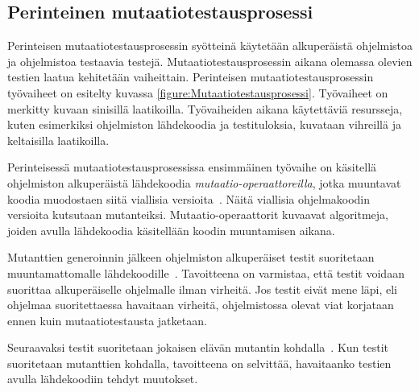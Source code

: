 \documentclass[finnish, grading]{tktltiki2}
\theoremstyle{definition}
\theoremstyle{remark}
\begin{document}


\subsection{Perinteinen mutaatiotestausprosessi}

Perinteisen mutaatiotestausprosessin syötteinä käytetään alkuperäistä ohjelmistoa ja ohjelmistoa testaavia testejä. Mutaatiotestausprosessin aikana olemassa olevien testien laatua kehitetään vaiheittain. Perinteisen mutaatiotestausprosessin työvaiheet on esitelty kuvassa \ref{figure:Mutaatiotestausprosessi}. Työvaiheet on merkitty kuvaan sinisillä laatikoilla. Työvaiheiden aikana käytettäviä resursseja, kuten esimerkiksi ohjelmiston lähdekoodia ja testituloksia, kuvataan vihreillä ja keltaisilla laatikoilla.

Perinteisessä mutaatiotestausprosessissa ensimmäinen työvaihe on käsitellä ohjelmiston alkuperäistä lähdekoodia \textit{mutaatio-operaattoreilla}, jotka muuntavat koodia muodostaen siitä viallisia versioita~\cite[s. 869]{Ma:Harrold:Kwon:2006}. Näitä viallisia ohjelmakoodin versioita kutsutaan mutanteiksi. Mutaatio-operaattorit kuvaavat algoritmeja, joiden avulla lähdekoodia käsitellään koodin muuntamisen aikana.

Mutanttien generoinnin jälkeen ohjelmiston alkuperäiset testit suoritetaan muuntamattomalle lähdekoodille~\cite[s. 652]{Jia:Harman:2011}. Tavoitteena on varmistaa, että testit voidaan suorittaa alkuperäiselle ohjelmalle ilman virheitä. Jos testit eivät mene läpi, eli ohjelmaa suoritettaessa havaitaan virheitä, ohjelmistossa olevat viat korjataan ennen kuin mutaatiotestausta jatketaan. 

Seuraavaksi testit suoritetaan jokaisen elävän mutantin kohdalla~\cite[s. 35]{Offutt:Untch:2001}. Kun testit suoritetaan mutanttien kohdalla, tavoitteena on selvittää, havaitaanko testien avulla lähdekoodiin tehdyt muutokset. 
\end{document}
